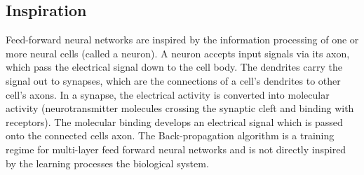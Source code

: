 \subsection{Inspiration}
Feed-forward neural networks are inspired by the information processing of one or more neural cells (called a neuron). 
A neuron accepts input signals via its axon, which pass the electrical signal down to the cell body. The dendrites carry the signal out to synapses, which are the connections of a cell's dendrites to other cell's axons. In a synapse, the electrical activity is converted into molecular activity (neurotransmitter molecules crossing the synaptic cleft and binding with receptors). The molecular binding develops an electrical signal which is passed onto the connected cells axon.
The Back-propagation algorithm is a training regime for multi-layer feed forward neural networks and is not directly inspired by the learning processes the biological system.


